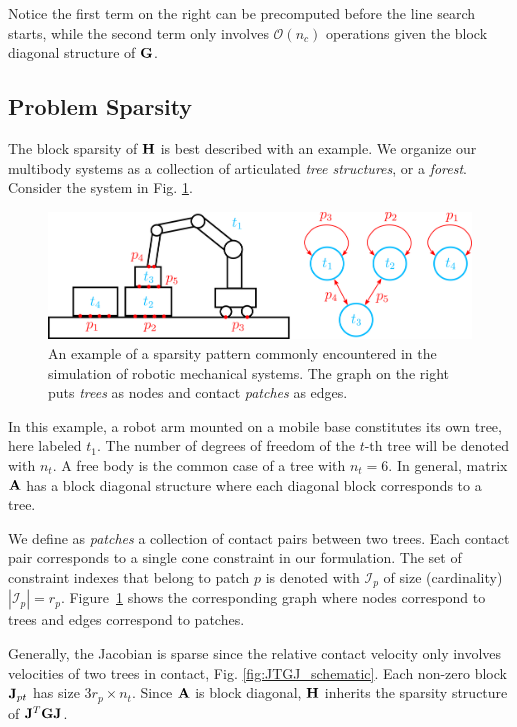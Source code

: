 Notice the first term on the right can be precomputed before the line search
 starts, while the second term only involves $\mathcal{O}(n_c)$ operations given
 the block diagonal structure of ${\mathbf{G}}$.

\subsection{Problem Sparsity}
\label{sec:problem_sparsity}

The block sparsity of ${\mathbf{H}}$  is best described with an example. We organize
our multibody systems as a collection of articulated \emph{tree structures}, or
a \emph{forest}. Consider the system in Fig. \ref{fig:sparsity_example}.
\begin{figure}[!h]
	\centering
	\includegraphics[width=0.9\columnwidth]{figures/schematics/sparsity_example.png}
	\caption{\label{fig:sparsity_example} 
	An example of a sparsity pattern commonly encountered in the simulation of
	robotic mechanical systems. The graph on the right puts \textit{trees} as
	nodes and contact \textit{patches} as edges.}
\end{figure}
In this example, a robot arm mounted on a mobile base constitutes its own tree,
here labeled $t_1$. The number of degrees of freedom of the $t\text{-th}$ tree
will be denoted with $n_t$. A free body is the common case of a tree with
$n_t=6$. In general, matrix ${\mathbf{A}}$ has a block diagonal structure where each
diagonal block corresponds to a tree.

We define as \textit{patches} a collection of contact pairs between two trees.
Each contact pair corresponds to a single cone constraint in our formulation.
The set of constraint indexes that belong to patch $p$ is denoted with
$\mathcal{I}_p$ of size (cardinality) $|\mathcal{I}_p| = r_p$.
Figure~\ref{fig:sparsity_example} shows the corresponding graph where nodes
correspond to trees and edges correspond to patches.

Generally, the Jacobian is sparse since the relative contact velocity only
involves velocities of two trees in contact, Fig. \ref{fig:JTGJ_schematic}. Each
non-zero block ${\mathbf{J}}_{pt}$ has size $3r_p\times n_t$. Since ${\mathbf{A}}$ is block
diagonal, ${\mathbf{H}}$ inherits the sparsity structure of ${\mathbf{J}}^T{\mathbf{G}}{\mathbf{J}}$.

